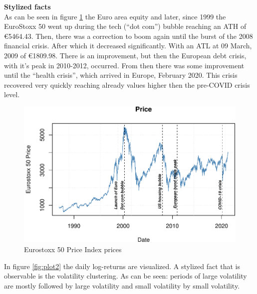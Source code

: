\documentclass[a4paper, twoside]{templates/ociamthesis}
\begin{document}
\textbf{Stylized facts}~\\
\noindent As can be seen in figure \ref{fig:plot1} the Euro area equity and later, since 1999 the EuroStoxx 50 went up during the tech (``dot com'') bubble reaching an ATH of €5464.43. Then, there was a correction to boom again until the burst of the 2008 financial crisis. After which it decreased significantly. With an ATL at 09 March, 2009 of €1809.98. There is an improvement, but then the European debt crisis, with it's peak in 2010-2012, occurred. From then there was some improvement until the ``health crisis'', which arrived in Europe, February 2020. This crisis recovered very quickly reaching already values higher then the pre-COVID crisis level.

\begin{figure}[h]

{\centering \includegraphics[width=1\linewidth]{_main_files/figure-latex/plot1-1} 

}

\caption{Eurostoxx 50 Price Index prices}\label{fig:plot1}
\end{figure}

\newpage

\noindent In figure \ref{fig:plot2} the daily log-returns are visualized. A stylized fact that is observable is the volatility clustering. As can be seen: periods of large volatility are mostly followed by large volatility and small volatility by small volatility.
\end{document}
